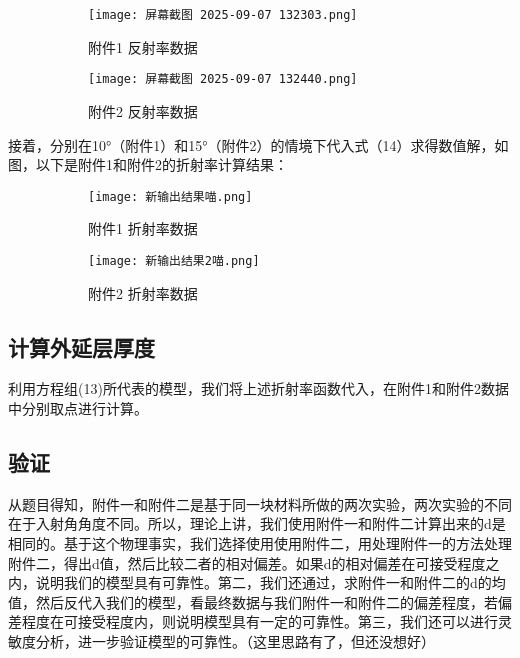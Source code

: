 \documentclass{cumcmthesis}
\begin{document}
\begin{figure}[H]
  \centering
  \begin{subfigure}[b]{0.45\linewidth}
    \texttt{[image: 屏幕截图 2025-09-07 132303.png]}

    \caption{附件1 反射率数据}
    \label{fig:附件1 反射率数据}
  \end{subfigure}
  \hfill
  \begin{subfigure}[b]{0.45\linewidth}
    \texttt{[image: 屏幕截图 2025-09-07 132440.png]}
    \caption{附件2 反射率数据}
    \label{fig:附件2 反射率数据}
  \end{subfigure}
  \caption{}
  \label{fig:double2}
\end{figure}
接着，分别在10°（附件1）和15°（附件2）的情境下代入式（14）求得数值解，如图，以下是附件1和附件2的折射率计算结果：
\begin{figure}[H]
  \centering
  \begin{subfigure}[b]{0.49\linewidth}
    \texttt{[image: 新输出结果喵.png]}

    \caption{附件1 折射率数据}
    \label{fig:附件1 反射率数据}
  \end{subfigure}
  \hfill
  \begin{subfigure}[b]{0.49\linewidth}
    \texttt{[image: 新输出结果2喵.png]}
    \caption{附件2 折射率数据}
    \label{fig:}
  \end{subfigure}
  \caption{}
  \label{fig:double3}
\end{figure}

\subsection{计算外延层厚度}
利用方程组(13)所代表的模型，我们将上述折射率函数代入，在附件1和附件2数据中分别取点进行计算。

	
\subsection{验证}
从题目得知，附件一和附件二是基于同一块材料所做的两次实验，两次实验的不同在于入射角角度不同。所以，理论上讲，我们使用附件一和附件二计算出来的d是相同的。基于这个物理事实，我们选择使用使用附件二，用处理附件一的方法处理附件二，得出d值，然后比较二者的相对偏差。如果d的相对偏差在可接受程度之内，说明我们的模型具有可靠性。第二，我们还通过，求附件一和附件二的d的均值，然后反代入我们的模型，看最终数据与我们附件一和附件二的偏差程度，若偏差程度在可接受程度内，则说明模型具有一定的可靠性。第三，我们还可以进行灵敏度分析，进一步验证模型的可靠性。（这里思路有了，但还没想好）
\end{document}
